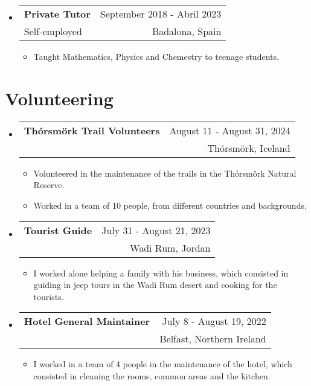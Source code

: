 \documentclass[a4paper,11pt]{article}
\makeatletter
\newcommand{\resumeQuadHeading}[4]{
  \item
  \begin{tabular*}{0.96\textwidth}[t]{l@{\extracolsep{\fill}}r}
    \textbf{#1} & \small #2 \\
    \small#3 & \small #4 \\
  \end{tabular*}
}
\newcommand{\resumeHeadingListStart}{
  \begin{itemize}[leftmargin=0.15in, label={}]
}
\newcommand{\resumeHeadingListEnd}{\end{itemize}}
\makeatother
\begin{document}
\resumeHeadingListStart{}
\resumeQuadHeading{Private Tutor}{September 2018 - Abril 2023}
{Self-employed}{Badalona, Spain}
\begin{itemize}[leftmargin=3em, itemsep=0.1em, topsep=2pt]
  \item \small Taught Mathematics, Physics and Chemestry to teenage students.
\end{itemize}
\resumeHeadingListEnd{}

\section{Volunteering}
\resumeHeadingListStart{}
\resumeQuadHeading{Thórsmörk Trail Volunteers}{August 11 - August 31, 2024}{}{Thórsmörk, Iceland}
\begin{itemize}[leftmargin=3em, itemsep=0.1em, topsep=2pt]
  \item \small Volunteered in the maintenance of the trails in the Thórsmörk Natural Reserve.
  \item \small Worked in a team of 10 people, from different countries and backgrounds.
\end{itemize}
\resumeHeadingListEnd{}


\resumeHeadingListStart{}
\resumeQuadHeading{Tourist Guide}{July 31 - August 21, 2023}{}{Wadi Rum, Jordan}
\begin{itemize}[leftmargin=3em, itemsep=0.1em, topsep=2pt]
  \item \small I worked alone helping a family with his business, which consisted in guiding in jeep tours in the Wadi Rum desert and cooking for the tourists.
\end{itemize}
\resumeHeadingListEnd{}


\resumeHeadingListStart{}
\resumeQuadHeading{Hotel General Maintainer}{July 8 - August 19, 2022}{}{Belfast, Northern Ireland}
\begin{itemize}[leftmargin=3em, itemsep=0.1em, topsep=2pt]
  \item \small I worked in a team of 4 people in the maintenance of the hotel, which consisted in cleaning the rooms, common areas and the kitchen.
\end{itemize}
\resumeHeadingListEnd{}


\end{document}
